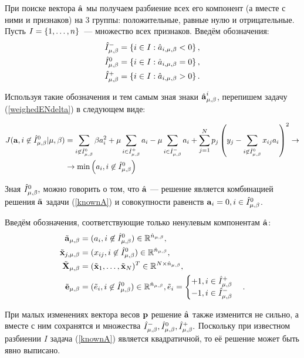 При поиске вектора $\hat{\boldsymbol{\mathbf{a}}}$ мы получаем разбиение всех его компонент (а вместе с ними и признаков) на 3 группы: положительные, равные нулю и отрицательные. 
Пусть $I=\left\{1,\ldots, n\right\}$~--- множество всех признаков. Введём  обозначения:
\begin{align}
	\hat I^-_{\mu,\beta} &= \left\{i\in I: \hat a_{i, {\mu,\beta}} < 0\right\}, \\
	\hat I^0_{\mu,\beta} &= \left\{i\in I: \hat a_{i, {\mu,\beta}} = 0\right\}, \\
	\hat I^+_{\mu,\beta} &= \left\{i\in I: \hat a_{i, {\mu,\beta}} > 0\right\}.
\end{align}

Используя такие обозначения и тем самым зная знаки $\hat{\boldsymbol{\mathbf{a}}}_{\mu,\beta}^i$, перепишем задачу (\ref{weighedENdelta}) в следующем виде:

\begin{align}
	\notag
	J(\boldsymbol{\mathbf{a}}, i\not\in \hat I^0_{\mu,\beta} | {\mu,\beta})
		&= \sum\limits_{i\not\in \hat I^0_{\mu,\beta}}\beta a_i^2 + \mu \sum\limits_{i\in \hat I^+_{\mu,\beta}}a_i - \mu \sum\limits_{i\in \hat I^-_{\mu,\beta}}a_i
		+ \sum\limits_{j=1}^N p_j\left(y_j - \sum\limits_{i\not\in \hat I^0_{\mu,\beta}}x_{ij}a_i\right)^2 \to \\
		\label{knownA}
		&\to \mathop{\mbox{min}}\limits\left(a_i, i\not\in \hat I^0_{\mu,\beta}\right)
\end{align}

Зная $\hat I^0_{\mu,\beta},$ можно говорить о том, что $\hat{\boldsymbol{\mathbf{a}}}$ --- решение является комбинацией решения $\tilde{{\boldsymbol{\mathbf{a}}}}$ задачи (\ref{knownA}) и совокупности равенств $\boldsymbol{\mathbf{a}}_i = 0, i\in \hat I^0_{\mu,\beta}$.

Введём обозначения, соответствующие только ненулевым компонентам $\hat{\boldsymbol{\mathbf{a}}}$:
\begin{align*}
	\tilde{\boldsymbol{\mathbf{a}}}_{\mu,\beta} &= (a_i, i\not\in \hat I^0_{\mu,\beta}) \in \mathbb{R}^{\hat n_{\mu,\beta}}, \\
	\tilde{\boldsymbol{\mathbf{x}}}_{j,{\mu,\beta}} &= (x_{ij}, i\not\in \hat I^0_{\mu,\beta}) \in \mathbb{R}^{\hat n_{\mu,\beta}}, \\
	\tilde{\boldsymbol{\mathbf{X}}}_{\mu,\beta} &= (\tilde{\boldsymbol{\mathbf{x}}}_1, \ldots, \tilde{\boldsymbol{\mathbf{x}}}_N)^T \in \mathbb{R}^{N \times \hat n_{\mu,\beta}}, \\
	\tilde{\boldsymbol{\mathbf{e}}}_{\mu,\beta} &= (\tilde e_i, i\not\in \hat I^0_{\mu,\beta}) \in \mathbb{R}^{\hat n_{\mu,\beta}},
		\tilde e_i = \begin{cases}+1, i \in \hat I^+_{\mu,\beta} \\-1, i \in \hat I^-_{\mu,\beta}\end{cases}.
\end{align*}

При малых изменениях вектора весов $\boldsymbol{\mathbf{p}}$ решение $\hat{\boldsymbol{\mathbf{a}}}$ также изменится не сильно, а вместе с ним сохранятся и множества $\hat I^-_{\mu,\beta}, \hat I^0_{\mu,\beta}, \hat I^+_{\mu,\beta}.$ Поскольку при известном разбиении $I$ задача (\ref{knownA}) является квадратичной, то её решение может быть явно выписано.

